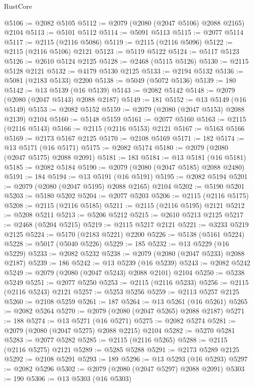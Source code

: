 \begin{lexlean}{RustCore}
\begin{coremodule}
@5106 := @2082 @5105
@5112 := @2079 (@2080 (@2047 @5106) @2088 @2165) @2104
@5113 := @5101 @5112
@5114 := @5091 @5113
@5115 := @2077 @5114
@5117 := @2115 (@2116 @5086)
@5119 := @2115 (@2116 @5096)
@5122 := @2115 (@2116 @5106) @2121
@5123 := @5119 @5122
@5124 := @5117 @5123
@5126 := @2610 @5124 @2125
@5128 := @2468 (@5115 @5126)
@5130 := @2115 @5128 @2121
@5132 := @4179 @5130 @2125
@5133 := @2194 @5132
@5136 := @5081 (@2183 @5133) @2200
@5138 := @5049 (@5072 @5136)
@5139 := 180
@5142 := @13 @5139 (@16 @5139)
@5143 := @2082 @5142
@5148 := @2079 (@2080 (@2047 @5143) @2088 @2187)
@5149 := 181
@5152 := @13 @5149 (@16 @5149)
@5153 := @2082 @5152
@5159 := @2079 (@2080 (@2047 @5153) @2088 @2139) @2104
@5160 := @5148 @5159
@5161 := @2077 @5160
@5163 := @2115 (@2116 @5143)
@5166 := @2115 (@2116 @5153) @2121
@5167 := @5163 @5166
@5169 := @2173 @5167 @2125
@5170 := @2108 @5169
@5171 := 182
@5174 := @13 @5171 (@16 @5171)
@5175 := @2082 @5174
@5180 := @2079 (@2080 (@2047 @5175) @2088 @2091)
@5181 := 183
@5184 := @13 @5181 (@16 @5181)
@5185 := @2082 @5184
@5190 := @2079 (@2080 (@2047 @5185) @2088 @2480)
@5191 := 184
@5194 := @13 @5191 (@16 @5191)
@5195 := @2082 @5194
@5201 := @2079 (@2080 (@2047 @5195) @2088 @2165) @2104
@5202 := @5190 @5201
@5203 := @5180 @5202
@5204 := @2077 @5203
@5206 := @2115 (@2116 @5175)
@5208 := @2115 (@2116 @5185)
@5211 := @2115 (@2116 @5195) @2121
@5212 := @5208 @5211
@5213 := @5206 @5212
@5215 := @2610 @5213 @2125
@5217 := @2468 (@5204 @5215)
@5219 := @2115 @5217 @2121
@5221 := @3233 @5219 @2125
@5224 := @5170 (@2183 @5221) @2200
@5226 := @5138 (@5161 @5224)
@5228 := @5017 (@5040 @5226)
@5229 := 185
@5232 := @13 @5229 (@16 @5229)
@5233 := @2082 @5232
@5238 := @2079 (@2080 (@2047 @5233) @2088 @2187)
@5239 := 186
@5242 := @13 @5239 (@16 @5239)
@5243 := @2082 @5242
@5249 := @2079 (@2080 (@2047 @5243) @2088 @2101) @2104
@5250 := @5238 @5249
@5251 := @2077 @5250
@5253 := @2115 (@2116 @5233)
@5256 := @2115 (@2116 @5243) @2121
@5257 := @5253 @5256
@5259 := @2113 @5257 @2125
@5260 := @2108 @5259
@5261 := 187
@5264 := @13 @5261 (@16 @5261)
@5265 := @2082 @5264
@5270 := @2079 (@2080 (@2047 @5265) @2088 @2187)
@5271 := 188
@5274 := @13 @5271 (@16 @5271)
@5275 := @2082 @5274
@5281 := @2079 (@2080 (@2047 @5275) @2088 @2215) @2104
@5282 := @5270 @5281
@5283 := @2077 @5282
@5285 := @2115 (@2116 @5265)
@5288 := @2115 (@2116 @5275) @2121
@5289 := @5285 @5288
@5291 := @2173 @5289 @2125
@5292 := @2108 @5291
@5293 := 189
@5296 := @13 @5293 (@16 @5293)
@5297 := @2082 @5296
@5302 := @2079 (@2080 (@2047 @5297) @2088 @2091)
@5303 := 190
@5306 := @13 @5303 (@16 @5303)

\end{coremodule}
\end{lexlean}
